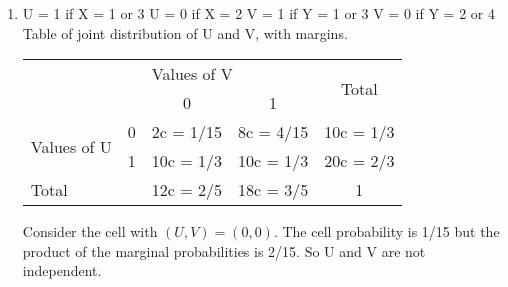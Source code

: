 \documentclass[a4paper,12pt]{article}
\begin{document}
\begin{enumerate}
\begin{table}[ht!]
\begin{tabular}{|p{15cm}|}
\hline

\noindent

(v) The random variables U and V are defined by
\begin{center}
\begin{tabular}{ll}
U = 1 if X = 1 or 3,& U = 0 if X = 2,\\
V = 1 if Y = 1 or 3,& V = 0 if Y = 2 or 4.\\
\end{tabular}
\end{center}
Tabulate the joint distribution of U and V and state with a reason whether or not U and V are independent.

\\ \hline
  
\end{tabular}

\end{table}


\item  U = 1 if X = 1 or 3 U = 0 if X = 2
V = 1 if Y = 1 or 3 V = 0 if Y = 2 or 4
Table of joint distribution of U and V, with margins.
\begin{center}
\begin{tabular}{cc|c|c|c|}
\cline{3-5}
                                                   &   & \multicolumn{2}{l|}{Values of V} & \multirow{2}{*}{Total} \\ \cline{3-4}
                                                   &   & 0               & 1              &                        \\ \hline
\multicolumn{1}{|l|}{\multirow{2}{*}{Values of U}} & 0 & 2c  =  1/15     & 8c  =  4/15    & 10c  =  1/3            \\ \cline{2-5} 
\multicolumn{1}{|l|}{}                             & 1 & 10c = 1/3       & 10c = 1/3      & 20c = 2/3              \\ \hline
\multicolumn{2}{|l|}{Total}                            & 12c = 2/5       & 18c = 3/5      & 1                      \\ \hline
\end{tabular}
\end{center}


Consider the cell with $(U, V) = (0, 0)$. The cell probability is 1/15 but the product of the marginal probabilities is 2/15. So U and V are not independent.
\end{enumerate}
\end{document}
